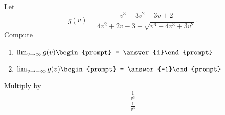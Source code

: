 \documentclass{ximera}
\author{Bart Snapp}
\begin{document}
\begin{exercise}
Let 
\[
g(v) = \frac{v^3-3 v^2-3 v+2}{4 v^2+2v-3+\sqrt{v^6-4 v^3+3 v^2}}.
\]
Compute
\begin{enumerate}
\item $\lim_{v\to \infty} g(v) \begin{prompt} = \answer{1}\end{prompt}$
\item $\lim_{v\to -\infty}g(v) \begin{prompt} = \answer{-1}\end{prompt}$
\end{enumerate}
\begin{hint}
Multiply by
\[
\frac{\frac{1}{v^3}}{\frac{1}{v^3}}
\]
\end{hint}
\end{exercise}
\end{document}
